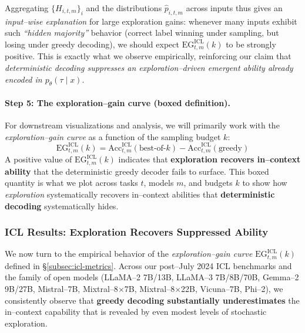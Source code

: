 Aggregating $\{H_{i,t,m}\}_i$ and the distributions $\hat{p}_{i,t,m}$ across
inputs thus gives an \emph{input--wise explanation} for large exploration
gains: whenever many inputs exhibit such \emph{``hidden majority''}
behavior (correct label winning under sampling, but losing under greedy
decoding), we should expect $\mathrm{EG}^{\text{ICL}}_{t,m}(k)$ to be
strongly positive. This is exactly what we observe empirically, reinforcing
our claim that \emph{deterministic decoding suppresses an
exploration--driven emergent ability already encoded in
$p_\theta(\tau\mid x)$}.

\vspace{0.3em}
\paragraph{\textbf{Step 5: The exploration--gain curve (boxed definition).}}
For downstream visualizations and analysis, we will primarily work with
the \emph{exploration--gain curve} as a function of the sampling budget
$k$:
\[
\boxed{
\mathrm{EG}^{\text{ICL}}_{t,m}(k)
= \mathrm{Acc}^{\text{ICL}}_{t,m}(\text{best-of-}k)
- \mathrm{Acc}^{\text{ICL}}_{t,m}(\text{greedy})
}
\]
A positive value of $\mathrm{EG}^{\text{ICL}}_{t,m}(k)$ indicates that
\textbf{exploration recovers in--context ability} that the deterministic
greedy decoder fails to surface.
This boxed quantity is what we plot across tasks $t$, models $m$, and
budgets $k$ to show how \emph{exploration} systematically recovers
in--context abilities that \textbf{deterministic decoding} systematically
hides.



\subsubsection{ICL Results: Exploration Recovers Suppressed Ability}
\label{subsec:icl-results}

We now turn to the empirical behavior of the \emph{exploration--gain curve}
$\mathrm{EG}^{\text{ICL}}_{t,m}(k)$ defined in
\S\ref{subsec:icl-metrics}. Across our post--July 2024 ICL benchmarks and
the family of open models (LLaMA--2 7B/13B, LLaMA--3 7B/8B/70B,
Gemma--2 9B/27B, Mistral--7B, Mixtral--8$\times$7B,
Mixtral--8$\times$22B, Vicuna--7B, Phi--2), we consistently observe that
\textbf{greedy decoding substantially underestimates} the in--context
capability that is revealed by even modest levels of stochastic
exploration.

\vspace{0.4em}
